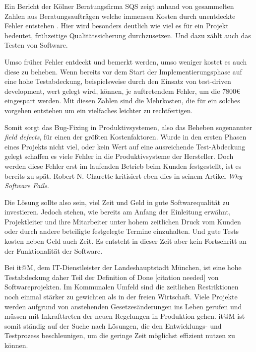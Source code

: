\documentclass[12pt,a4paper,bibliography=totocnumbered,listof=totocnumbered]{scrartcl}
\begin{document}
Ein Bericht der Kölner Beratungsfirma SQS zeigt anhand von gesammelten Zahlen aus Beratungsaufträgen welche immensen Kosten durch unentdeckte Fehler entstehen \cite{sqsdefect}. Hier wird besonders deutlich wie viel es für ein Projekt bedeutet, frühzeitige Qualitätssicherung durchzusetzen. Und dazu zählt auch das Testen von Software.


Umso früher Fehler entdeckt und bemerkt werden, umso weniger kostet es auch diese zu beheben. Wenn bereits vor dem Start der Implementierungsphase auf eine hohe Testabdeckung, beispielsweise durch den Einsatz von test-driven development, wert gelegt wird, können, je auftretendem Fehler, um die 7800\euro\ \cite{sqsdefect} eingespart werden. Mit diesen Zahlen sind die Mehrkosten, die für ein solches vorgehen entstehen um ein vielfaches leichter zu rechtfertigen.

Somit sorgt das Bug-Fixing in Produktivsystemen, also das Beheben sogenannter \textit{field defects}, für einen der größten Kostenfaktoren. Wurde in den ersten Phasen eines Projekts nicht viel, oder kein Wert auf eine ausreichende Test-Abdeckung gelegt schaffen es viele Fehler in die Produktivsysteme der Hersteller. Doch werden diese Fehler erst im laufenden Betrieb beim Kunden festgestellt, ist es bereits zu spät. Robert N. Charette kritisiert eben dies in seinem Artikel \textit{Why Software Fails}\cite{charette}.


Die Lösung sollte also sein, viel Zeit und Geld in gute Softwarequalität zu investieren. Jedoch stehen, wie bereits am Anfang der Einleitung erwähnt, Projektleiter und ihre Mitarbeiter unter hohem zeitlichen Druck vom Kunden oder durch andere beteiligte festgelegte Termine einzuhalten. Und gute Tests kosten neben Geld auch Zeit. Es entsteht in dieser Zeit aber kein Fortschritt an der Funktionalität der Software.

Bei it@M, dem IT-Dienstleister der Landeshauptstadt München, ist eine hohe Testabdeckung daher Teil der Definition of Done [citation needed] von Softwareprojekten. Im Kommunalen Umfeld sind die zeitlichen Restriktionen noch einmal stärker zu gewichten als in der freien Wirtschaft. Viele Projekte werden aufgrund von anstehenden Gesetzesänderungen ins Leben gerufen und müssen mit Inkrafttreten der neuen Regelungen in Produktion gehen. it@M ist somit ständig auf der Suche nach Lösungen, die den Entwicklungs- und Testprozess beschleunigen, um die geringe Zeit möglichst effizient nutzen zu können.
\end{document}

